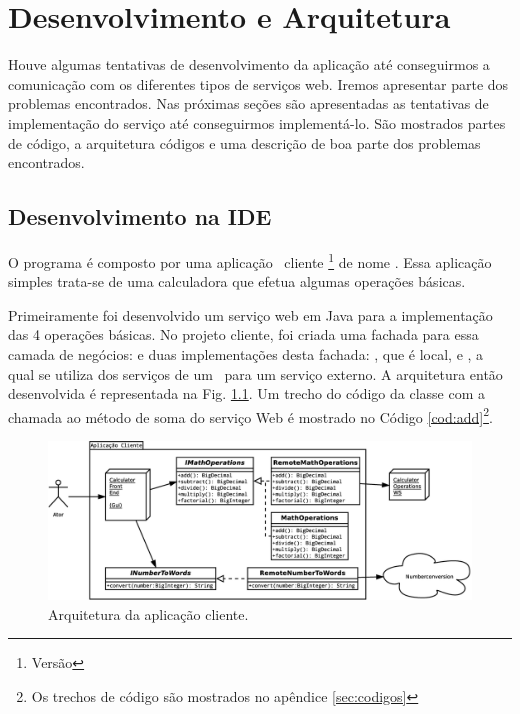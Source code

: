 %

\chapter{Desenvolvimento e Arquitetura}

Houve algumas tentativas de desenvolvimento da aplicação até conseguirmos a
comunicação com os diferentes tipos de serviços web. Iremos apresentar parte dos
problemas encontrados. Nas próximas seções são apresentadas as tentativas de
implementação do serviço até conseguirmos implementá-lo. São mostrados partes de
código, a arquitetura códigos e uma descrição de boa parte dos problemas
encontrados. 

\section{Desenvolvimento na IDE \NetBeansv}

O programa é composto por uma aplicação \desktop\ cliente \Java\footnote{Versão
\Javav} de nome . Essa aplicação simples trata-se de uma
calculadora que efetua algumas operações básicas. 

Primeiramente foi desenvolvido um serviço web em Java para a implementação das 4
operações básicas. No projeto cliente, foi criada uma fachada para essa camada
de negócios:  e duas implementações desta fachada:
, que é local, e , a qual
se utiliza dos serviços de um \proxy\ para um serviço externo. A arquitetura então
desenvolvida é representada na Fig.  \ref{fig:arquitetura:calc}. Um trecho do
código da classe  com a chamada ao método de soma do
serviço Web é mostrado no Código \ref{cod:add}\footnote{Os trechos de código são
mostrados no apêndice \ref{sec:codigos}}.

\begin{figure}[htb]
  \centering
    \includegraphics[width=\textwidth]{imgs/calculadora}
  \caption{Arquitetura da aplicação cliente.}
  \label{fig:arquitetura:calc}
\end{figure}

